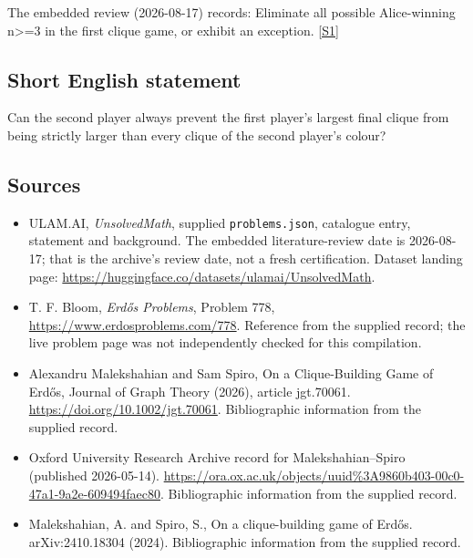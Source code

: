 \documentclass[11pt,a4paper]{article}
\newcommand{\sref}[2]{\hyperlink{source:#1:#2}{[S#2]}}
\begin{document}
The embedded review (2026-08-17) records: Eliminate all possible Alice-winning n>=3 in the first clique game, or exhibit an exception. \sref{statement}{1}

\subsection{Short English statement}

Can the second player always prevent the first player's largest final clique from being strictly larger than every clique of the second player's colour?

\subsection{Sources}

{\small

\begin{itemize}

\item[\hypertarget{source:statement:1}{S1}] ULAM.AI, \emph{UnsolvedMath}, supplied \texttt{problems.json}, catalogue entry, statement and background. The embedded literature-review date is 2026-08-17; that is the archive’s review date, not a fresh certification. Dataset landing page: \url{https://huggingface.co/datasets/ulamai/UnsolvedMath}.

\item[\hypertarget{source:statement:2}{S2}] T. F. Bloom, \emph{Erdős Problems}, Problem 778, \url{https://www.erdosproblems.com/778}. Reference from the supplied record; the live problem page was not independently checked for this compilation.

\item[\hypertarget{source:statement:3}{S3}] Alexandru Malekshahian and Sam Spiro, On a Clique-Building Game of Erdős, Journal of Graph Theory (2026), article jgt.70061. \url{https://doi.org/10.1002/jgt.70061}. Bibliographic information from the supplied record.

\item[\hypertarget{source:statement:4}{S4}] Oxford University Research Archive record for Malekshahian--Spiro (published 2026-05-14). \url{https://ora.ox.ac.uk/objects/uuid%3A9860b403-00c0-47a1-9a2e-609494faec80}. Bibliographic information from the supplied record.

\item[\hypertarget{source:statement:5}{S5}] Malekshahian, A. and Spiro, S., On a clique-building game of Erd\H{o}s. arXiv:2410.18304 (2024). Bibliographic information from the supplied record.

\end{itemize}

}

\label{end:statement}
\end{document}
